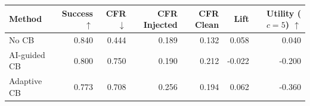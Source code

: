 \begin{tabular}{lrrrrrr}
\toprule
Method & Success $\uparrow$ & CFR $\downarrow$ & CFR Injected & CFR Clean & Lift & Utility ($c=5$) $\uparrow$ \\
\midrule
No CB & 0.840 & 0.444 & 0.189 & 0.132 & 0.058 & 0.040 \\
AI-guided CB & 0.800 & 0.750 & 0.190 & 0.212 & -0.022 & -0.200 \\
Adaptive CB & 0.773 & 0.708 & 0.256 & 0.194 & 0.062 & -0.360 \\
\bottomrule
\end{tabular}
